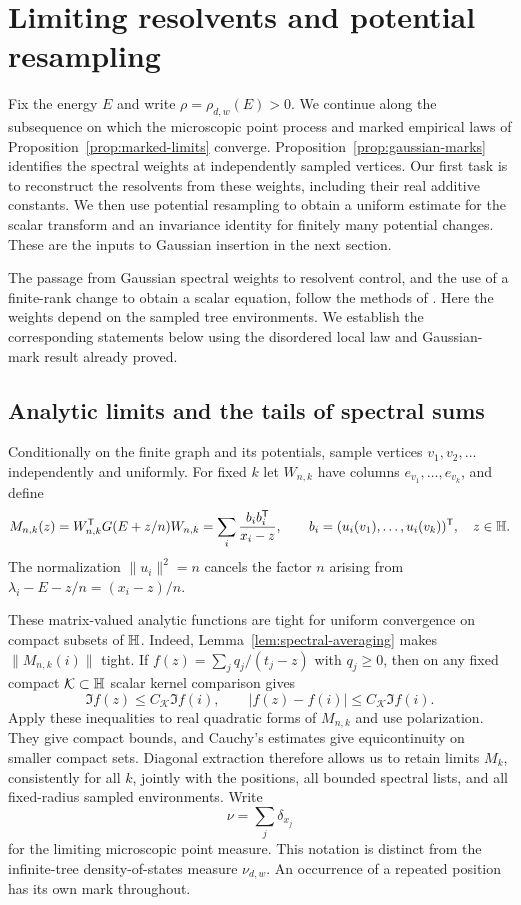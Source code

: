 \section{Limiting resolvents and potential resampling}\label{sec:resolvents}

Fix the energy $E$ and write $\rho=\rho_{d,w}(E)>0$. We continue along
the subsequence on which the microscopic point process and marked
empirical laws of Proposition~\ref{prop:marked-limits} converge.
Proposition~\ref{prop:gaussian-marks} identifies the spectral weights at
independently sampled vertices. Our first task is to reconstruct the
resolvents from these weights, including their real additive constants.
We then use potential resampling to obtain a uniform estimate for the
scalar transform and an invariance identity for finitely many potential
changes. These are the inputs to Gaussian insertion in the next section.

The passage from Gaussian spectral weights to resolvent control, and the
use of a finite-rank change to obtain a scalar equation, follow the
methods of \cite[Section~4]{bu}. Here the weights depend on the sampled
tree environments. We establish the corresponding statements below
using the disordered local law and Gaussian-mark result already proved.

\subsection{Analytic limits and the tails of spectral sums}

Conditionally on the finite graph and its potentials, sample vertices
$v_1,v_2,\ldots$ independently and uniformly. For fixed $k$ let
$W_{n,k}$ have columns $e_{v_1},\ldots,e_{v_k}$, and define
\begin{equation}\label{eq:sampled-compression}
 M_{n,k}(z)=W_{n,k}^{\mathsf T}G(E+z/n)W_{n,k}
       =\sum_i\frac{b_i b_i^{\mathsf T}}{x_i-z},
 \qquad
 b_i=(u_i(v_1),\ldots,u_i(v_k))^{\mathsf T},\quad z\in\mathbb H.
\end{equation}
The normalization $\|u_i\|^2=n$ cancels the factor $n$ arising from
$\lambda_i-E-z/n=(x_i-z)/n$.

These matrix-valued analytic functions are tight for uniform convergence
on compact subsets of $\mathbb H$. Indeed,
Lemma~\ref{lem:spectral-averaging} makes $\|M_{n,k}(i)\|$ tight. If
$f(z)=\sum_j q_j/(t_j-z)$ with $q_j\ge0$, then on any fixed compact
$\mathcal K\subset\mathbb H$ scalar kernel comparison gives
\[
 \Im f(z)\le C_{\mathcal K}\Im f(i),\qquad
 |f(z)-f(i)|\le C_{\mathcal K}\Im f(i).
\]
Apply these inequalities to real quadratic forms of $M_{n,k}$ and use
polarization. They give compact bounds, and Cauchy's estimates give
equicontinuity on smaller compact sets. Diagonal extraction therefore
allows us to retain limits $M_k$, consistently for all $k$, jointly with
the positions, all bounded spectral lists, and all fixed-radius sampled
environments. Write
\[
                         \nu=\sum_j\delta_{x_j}
\]
for the limiting microscopic point measure. This notation is distinct
from the infinite-tree density-of-states measure $\nu_{d,w}$.
An occurrence of a repeated position has its own mark throughout.

